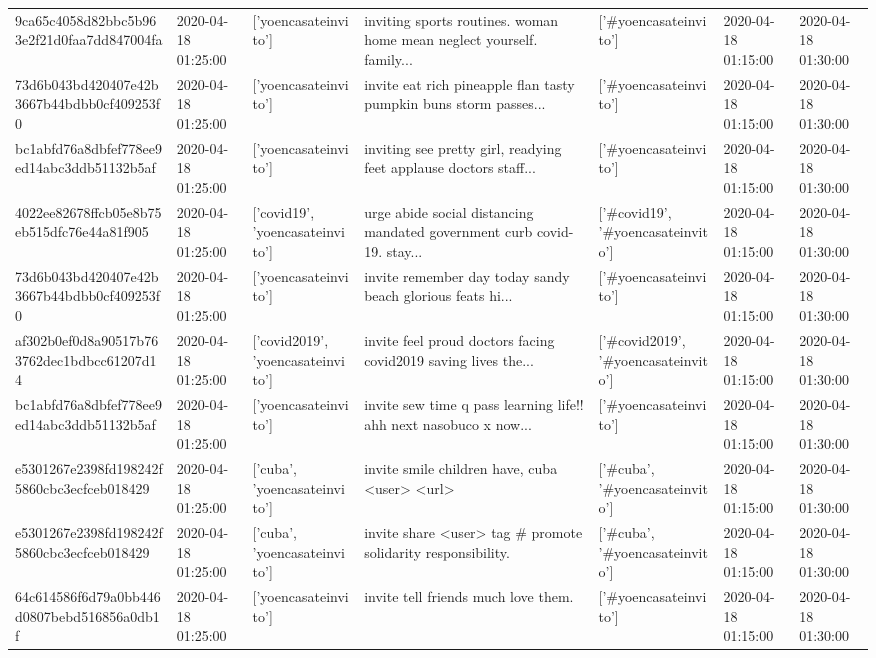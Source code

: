 \begin{tabular}{lllllll}
9ca65c4058d82bbc5b963e2f21d0faa7dd847004fa & 2020-04-18 01:25:00 & ['yoencasateinvito'] & inviting sports routines. woman home mean neglect yourself. family... & ['#yoencasateinvito'] & 2020-04-18 01:15:00 & 2020-04-18 01:30:00 \\
73d6b043bd420407e42b3667b44bdbb0cf409253f0 & 2020-04-18 01:25:00 & ['yoencasateinvito'] & invite eat rich pineapple flan tasty pumpkin buns storm passes... & ['#yoencasateinvito'] & 2020-04-18 01:15:00 & 2020-04-18 01:30:00 \\
bc1abfd76a8dbfef778ee9ed14abc3ddb51132b5af & 2020-04-18 01:25:00 & ['yoencasateinvito'] & inviting see pretty girl, readying feet applause doctors staff... & ['#yoencasateinvito'] & 2020-04-18 01:15:00 & 2020-04-18 01:30:00 \\
4022ee82678ffcb05e8b75eb515dfc76e44a81f905 & 2020-04-18 01:25:00 & ['covid19', 'yoencasateinvito'] & urge abide social distancing mandated government curb covid-19. stay... & ['#covid19', '#yoencasateinvito'] & 2020-04-18 01:15:00 & 2020-04-18 01:30:00 \\
73d6b043bd420407e42b3667b44bdbb0cf409253f0 & 2020-04-18 01:25:00 & ['yoencasateinvito'] & invite remember day today sandy beach glorious feats hi... & ['#yoencasateinvito'] & 2020-04-18 01:15:00 & 2020-04-18 01:30:00 \\
af302b0ef0d8a90517b763762dec1bdbcc61207d14 & 2020-04-18 01:25:00 & ['covid2019', 'yoencasateinvito'] & invite feel proud doctors facing covid2019 saving lives the... & ['#covid2019', '#yoencasateinvito'] & 2020-04-18 01:15:00 & 2020-04-18 01:30:00 \\
bc1abfd76a8dbfef778ee9ed14abc3ddb51132b5af & 2020-04-18 01:25:00 & ['yoencasateinvito'] & invite sew time q pass learning life!! ahh next nasobuco x now... & ['#yoencasateinvito'] & 2020-04-18 01:15:00 & 2020-04-18 01:30:00 \\
e5301267e2398fd198242f5860cbc3ecfceb018429 & 2020-04-18 01:25:00 & ['cuba', 'yoencasateinvito'] & invite smile children have, cuba <user> <url> & ['#cuba', '#yoencasateinvito'] & 2020-04-18 01:15:00 & 2020-04-18 01:30:00 \\
e5301267e2398fd198242f5860cbc3ecfceb018429 & 2020-04-18 01:25:00 & ['cuba', 'yoencasateinvito'] & invite share <user> tag \# promote solidarity responsibility. & ['#cuba', '#yoencasateinvito'] & 2020-04-18 01:15:00 & 2020-04-18 01:30:00 \\
64c614586f6d79a0bb446d0807bebd516856a0db1f & 2020-04-18 01:25:00 & ['yoencasateinvito'] & invite tell friends much love them. & ['#yoencasateinvito'] & 2020-04-18 01:15:00 & 2020-04-18 01:30:00 \\

\end{tabular}
